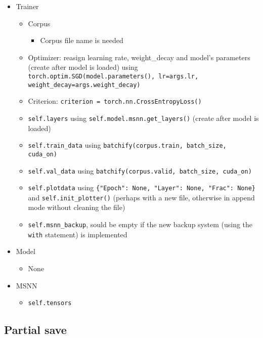 \begin{itemize}
\item
  Trainer

  \begin{itemize}
  \item
    Corpus

    \begin{itemize}
    \item
      Corpus file name is needed
    \end{itemize}
  \item
    Optimizer: reasign learning rate, weight\_decay and model's
    parameters (create after model is loaded) using
    \lstinline!torch.optim.SGD(model.parameters(), lr=args.lr, weight_decay=args.weight_decay)!
  \item
    Criterion: \lstinline!criterion = torch.nn.CrossEntropyLoss()!
  \item
    \lstinline!self.layers! using
    \lstinline!self.model.msnn.get_layers()! (create after model is
    loaded)
  \item
    \lstinline!self.train_data! using
    \lstinline!batchify(corpus.train, batch_size, cuda_on)!
  \item
    \lstinline!self.val_data! using
    \lstinline!batchify(corpus.valid, batch_size, cuda_on)!
  \item
    \lstinline!self.plotdata! using
    \lstinline!{"Epoch": None, "Layer": None, "Frac": None}! and
    \lstinline!self.init_plotter()! (perhaps with a new file, otherwise
    in append mode without cleaning the file)
  \item
    \lstinline!self.msnn_backup!, sould be empty if the new backup
    system (using the \lstinline!with! statement) is implemented
  \end{itemize}
\item
  Model

  \begin{itemize}
  \item
    None
  \end{itemize}
\item
  MSNN

  \begin{itemize}
  \item
    \lstinline!self.tensors!
  \end{itemize}
\end{itemize}

\subsection{Partial save}

